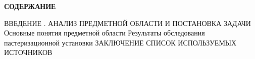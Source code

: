 {\cyrillicfont \fontsize{14pt}{0pt}\selectfont \englishfont \bfseries
    СОДЕРЖАНИЕ
    \vspace{42pt}
} 

{\cyrillicfont 
\fontsize{13pt}{15.6pt}\selectfont 
\englishfont

    ВВЕДЕНИЕ  . АНАЛИЗ ПРЕДМЕТНОЙ ОБЛАСТИ И ПОСТАНОВКА ЗАДАЧИ   Основные понятия предметной области   Результаты обследования пастеризационной установки \newline
    ЗАКЛЮЧЕНИЕ  \newline
    СПИСОК ИСПОЛЬЗУЕМЫХ ИСТОЧНИКОВ  \newline
}